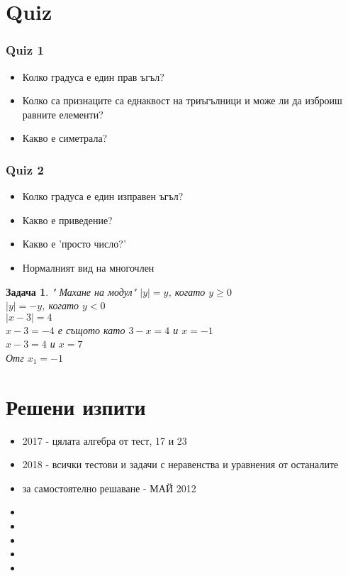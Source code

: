 \documentclass{article}
\theoremstyle{plain}
\newtheorem{problem}{Задача}
\begin{document}
\newpage
\section{Quiz}

\subsubsection{Quiz 1}
\begin{itemize}
	\item Колко градуса е един прав ъгъл?
	\item Колко са признаците са еднаквост на триъгълници и може ли да изброиш равните елементи?
	
	
	\item Какво е симетрала?
\end{itemize}


\subsubsection{Quiz 2}
\begin{itemize}
	\item Колко градуса е един изправен ъгъл?
	\item Какво е приведение?
	\item Какво е 'просто число?'
	\item Нормалният вид на многочлен
\end{itemize}


\begin{problem}" Махане на модул"
	$|y| = y   $, когато $y\geq 0 $\\
	$|y| = -y  $, когато $y<0 $\\
	
	$\left| x -3 \right| = 4 $\\
	$ x - 3= -4 $ е същото като  $ 3-x = 4 $ и $x = -1 $\\
	$ x - 3 = 4 $ и  $x = 7 $\\
	
	Отг $x_1 = -1  $
\end{problem}



 

\section{Решени изпити}

\begin{itemize}
	\item 2017 - цялата алгебра от тест, 17 и 23
	\item 2018 - всички тестови и задачи с неравенства и уравнения от останалите 
	\item за самостоятелно решаване - МАЙ 2012
	\item 
	\item 
	\item 
	\item 
	\item 
	
\end{itemize}
\end{document}
